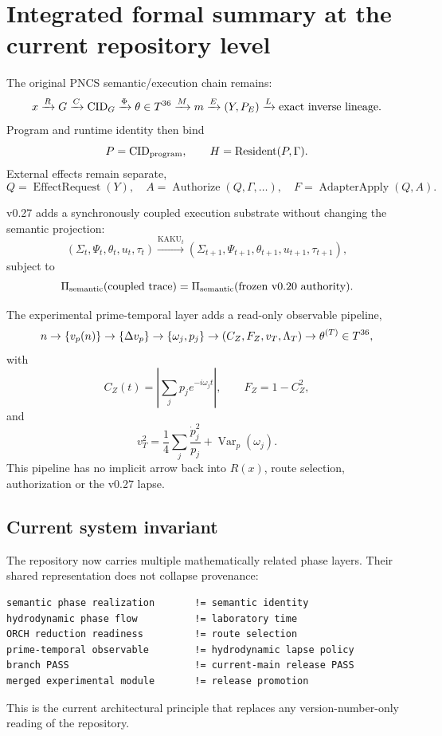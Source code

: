 \chapter{Integrated formal summary at the current repository level}

The original PNCS semantic/execution chain remains:
\[
x\xrightarrow{R}G\xrightarrow{C}\mathrm{CID}_G
\xrightarrow{\Phi}\theta\in T^{36}
\xrightarrow{M}m
\xrightarrow{E}(Y,P_E)
\xrightarrow{L}\text{exact inverse lineage}.
\]
Program and runtime identity then bind
\[
P=\mathrm{CID}_{\rm program},
\qquad
H=\operatorname{Resident}(P,\Gamma).
\]
External effects remain separate,
\[
Q=\operatorname{EffectRequest}(Y),\quad
A=\operatorname{Authorize}(Q,\Gamma,\ldots),\quad
F=\operatorname{AdapterApply}(Q,A).
\]

v0.27 adds a synchronously coupled execution substrate without changing the semantic projection:
\[
(\Sigma_t,\Psi_t,\theta_t,u_t,\tau_t)
\xrightarrow{\mathrm{KAKU}_t}
(\Sigma_{t+1},\Psi_{t+1},\theta_{t+1},u_{t+1},\tau_{t+1}),
\]
subject to
\[
\Pi_{\rm semantic}(\text{coupled trace})
=\Pi_{\rm semantic}(\text{frozen v0.20 authority}).
\]

The experimental prime-temporal layer adds a read-only observable pipeline,
\[
n\to \{v_p(n)\}\to\{\Delta v_p\}
\to\{\omega_j,p_j\}
\to(C_Z,F_Z,v_T,\Lambda_T)
\to\theta^{(T)}\in T^{36},
\]
with
\[
C_Z(t)=\left|\sum_jp_je^{-i\omega_jt}\right|,
\qquad
F_Z=1-C_Z^2,
\]
and
\[
v_T^2=\frac14\sum_j\frac{\dot p_j^2}{p_j}+\operatorname{Var}_p(\omega_j).
\]
This pipeline has no implicit arrow back into \(R(x)\), route selection, authorization or the v0.27 lapse.

\section{Current system invariant}
The repository now carries multiple mathematically related phase layers. Their shared representation does not collapse provenance:
\begin{lstlisting}
semantic phase realization       != semantic identity
hydrodynamic phase flow          != laboratory time
ORCH reduction readiness         != route selection
prime-temporal observable        != hydrodynamic lapse policy
branch PASS                      != current-main release PASS
merged experimental module       != release promotion
\end{lstlisting}

This is the current architectural principle that replaces any version-number-only reading of the repository.
